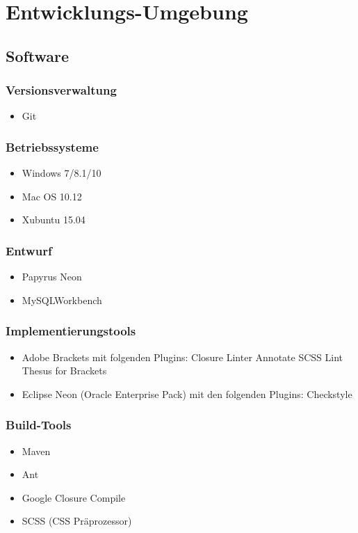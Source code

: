 \section{Entwicklungs-Umgebung}
\subsection{Software}
	\subsubsection{Versionsverwaltung}
		\begin{itemize}
			\item Git
		\end{itemize}
	\subsubsection{Betriebssysteme}
		\begin{itemize}
			\item Windows 7/8.1/10
			\item Mac OS 10.12
			\item Xubuntu 15.04
		\end{itemize}
	\subsubsection{Entwurf}
		\begin{itemize}
			\item Papyrus Neon
			\item MySQLWorkbench
		\end{itemize}
	\subsubsection{Implementierungstools}
		\begin{itemize}
			\item Adobe Brackets mit folgenden Plugins:
				\subitem Closure Linter
				\subitem Annotate
				\subitem SCSS Lint
				\subitem Thesus for Brackets
			\item Eclipse Neon (Oracle Enterprise Pack) mit den folgenden Plugins:
				\subitem Checkstyle
		\end{itemize}
	\subsubsection{Build-Tools}
		\begin{itemize}
			\item Maven
			\item Ant
			\item Google Closure Compile
			\item SCSS (CSS Präprozessor)
		\end{itemize}
